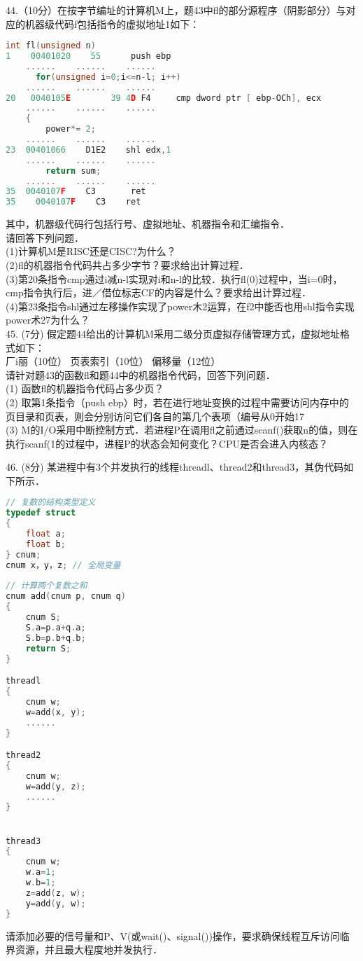 44.（10分）在按字节编址的计算机M上，题43中fl的部分源程序（阴影部分）与对应的机器级代码f包括指令的虚拟地址1如下：
\begin{lstlisting}[language=cpp]
      int fl(unsigned n)
1    00401020    55      push ebp
    ......    ......    ......
      for(unsigned i=0;i<=n-l; i++)
    ......    ......    ......
20   0040105E        39 4D F4     cmp dword ptr [ ebp-OCh], ecx
    ......    ......    ......
    {
        power*= 2;
    ......    ......    ......
23  00401066    D1E2    shl edx,1
    ......    ......    ......
        return sum;
    ......    ......    ......
35  0040107F    C3       ret
35    0040107F    C3    ret
\end{lstlisting}
其中，机器级代码行包括行号、虚拟地址、机器指令和汇编指令． \\
请回答下列问题． \\
(1)计算机M是RISC还是CISC?为什么？ \\
(2)fl的机器指令代码共占多少字节？要求给出计算过程． \\
(3)第20条指令cmp通过i减n-l实现对i和n-l的比较．执行fl(0)过程中，当i=0时，cmp指令执行后，进／借位标志CF的内容是什么？要求给出计算过程． \\
(4)第23条指令shl通过左移操作实现了power木2运算，在f2中能否也用shl指令实现power术27为什么？ \\

45. (7分) 假定题44给出的计算机M采用二级分页虚拟存储管理方式，虚拟地址格式如下： \\
厂i丽（10位）    页表索引（10位）    偏移量（12位） \\
请针对题43的函数fl和题44中的机器指令代码，回答下列问题． \\
(1) 函数fl的机器指令代码占多少页？ \\
(2) 取第1条指令（push ebp）时，若在进行地址变换的过程中需要访问内存中的页目录和页表，则会分别访问它们各自的第几个表项（编号从0开始17 \\
(3) M的I/O采用中断控制方式．若进程P在调用fl之前通过scanf()获取n的值，则在执行scanf(1的过程中，进程P的状态会知何变化？CPU是否会进入内核态？

46. (8分) 某进程中有3个并发执行的线程threadl、thread2和thread3，其伪代码如下所示． \\
\begin{lstlisting}[language=cpp]
// 复数的结构类型定义
typedef struct       
{
    float a;
    float b;
} cnum;         
cnum x，y，z; // 全局变量
                          
// 计算两个复数之和     
cnum add(cnum p, cnum q)
{                         
    cnum S;  
    S.a=p.a+q.a;
    S.b=p.b+q.b;      
    return S;
}

threadl
{             
    cnum w;
    w=add(x, y);
    ......
}

thread2
{
    cnum w;
    w=add(y, z);
    ......
}


thread3
{
    cnum w;
    w.a=1;
    w.b=1;
    z=add(z, w);
    y=add(y, w);
}
\end{lstlisting}
请添加必要的信号量和P、V(或wait()、signal())操作，要求确保线程互斥访问临界资源，并且最大程度地并发执行．

